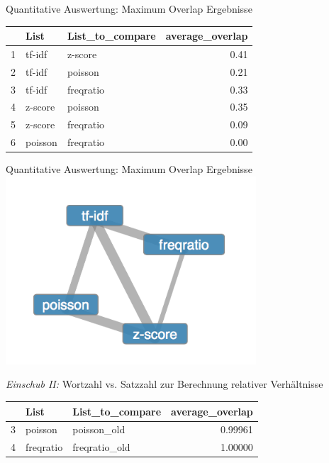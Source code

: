 \documentclass{beamer}
\begin{document}
\begin{frame}{Quantitative Auswertung: Maximum Overlap Ergebnisse}
\begin{table}[ht]
\centering
\begin{tabular}{rllr}
  \hline
 & List & List\_to\_compare & average\_overlap \\ 
  \hline
1 & tf-idf & z-score & 0.41 \\ 
  2 & tf-idf & poisson & 0.21 \\ 
  3 & tf-idf & freqratio & 0.33 \\ 
  4 & z-score & poisson & 0.35 \\ 
  5 & z-score & freqratio & 0.09 \\ 
  6 & poisson & freqratio & 0.00 \\ 
   \hline
\end{tabular}
\label{AvarageOverlapComparison}
\end{table}
\end{frame}

\begin{frame}{Quantitative Auswertung: Maximum Overlap Ergebnisse}
	  \centering
	  \includegraphics[width=0.7\textwidth]{pictures/measureCompare.png}
	  
\end{frame}

\begin{frame}{\emph{Einschub II: }Wortzahl vs. Satzzahl zur Berechnung relativer Verh\"altnisse}
	\begin{table}[ht]
	\centering
	\begin{tabular}{rllr}
	  \hline
	 & List & List\_to\_compare & average\_overlap \\ 
	  \hline
	3 & poisson & poisson\_old &    0.99961 \\ 
	  4 & freqratio & freqratio\_old & 1.00000 \\ 
	   \hline
\end{tabular}

\label{AvarageOverlapComparison}
\end{table}
\end{frame}
\end{document}
